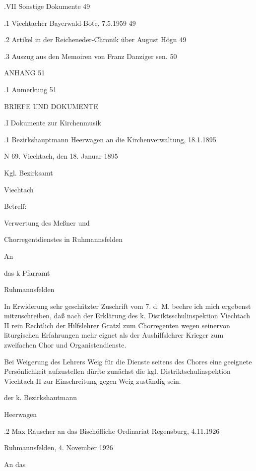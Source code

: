 \documentclass{book}
\begin{document}
.VII Sonstige Dokumente 49

.1 Viechtacher Bayerwald-Bote, 7.5.1959 49

.2 Artikel in der Reicheneder-Chronik über August Högn  49

.3 Auszug aus den Memoiren von Franz Danziger sen.  50

ANHANG  51

.1 Anmerkung    51





BRIEFE UND DOKUMENTE

.I Dokumente zur Kirchenmusik

.1 Bezirkshauptmann Heerwagen an die Kirchenverwaltung, 18.1.1895

N 69.               Viechtach, den 18. Januar 1895



Kgl. Bezirksamt

Viechtach



Betreff:



Verwertung des Meßner und

Chorregentdienstes in Ruhmannsfelden



An

das k Pfarramt

Ruhmannsfelden



In Erwiderung sehr geschätzter Zuschrift vom 7. d. M. beehre ich mich ergebenst
mitzuschreiben, daß nach der Erklärung des k. Distiktsschulinspektion Viechtach
II rein Rechtlich der Hilfslehrer Gratzl zum Chorregenten wegen seinervon
liturgischen Erfahrungen mehr  eignet als der Aushilfslehrer Krieger zum
zweifachen Chor und Organistendienste.

Bei  Weigerung des Lehrers Weig für die Dienste seitens des Chores eine
geeignete Persönlichkeit aufzustellen dürfte zunächst die kgl.
Distriktschulinspektion Viechtach II zur Einschreitung gegen Weig zuständig
sein.



der k. Bezirkshautmann



Heerwagen

.2 Max Rauscher an das Bischöfliche Ordinariat Regensburg, 4.11.1926

Ruhmannsfelden, 4. November 1926

An das
\end{document}

